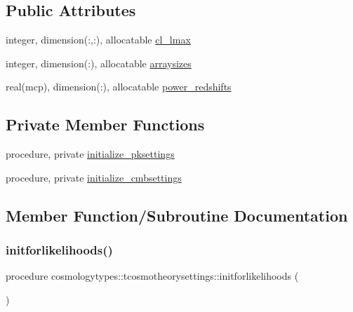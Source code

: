 \subsection*{Public Attributes}
\begin{DoxyCompactItemize}
\item 
integer, dimension(\+:,\+:), allocatable \mbox{\hyperlink{structcosmologytypes_1_1tcosmotheorysettings_a5f4c0617346a109327585503014b734b}{cl\+\_\+lmax}}
\item 
integer, dimension(\+:), allocatable \mbox{\hyperlink{structcosmologytypes_1_1tcosmotheorysettings_a6cff9fff9bb45659c5d3a46e14010fe9}{arraysizes}}
\item 
real(mcp), dimension(\+:), allocatable \mbox{\hyperlink{structcosmologytypes_1_1tcosmotheorysettings_a509595c93e5588acbd6f1fbed9b77b4f}{power\+\_\+redshifts}}
\end{DoxyCompactItemize}
\subsection*{Private Member Functions}
\begin{DoxyCompactItemize}
\item 
procedure, private \mbox{\hyperlink{structcosmologytypes_1_1tcosmotheorysettings_a0527440b3f7b83faa315a177b46bcf0d}{initialize\+\_\+pksettings}}
\item 
procedure, private \mbox{\hyperlink{structcosmologytypes_1_1tcosmotheorysettings_a378270daf8f0a63957a1ec6fae4beed1}{initialize\+\_\+cmbsettings}}
\end{DoxyCompactItemize}


\subsection{Member Function/\+Subroutine Documentation}
\mbox{\label{structcosmologytypes_1_1tcosmotheorysettings_af515fcc7628babb86fc20d5be711de16}} 
\subsubsection{\texorpdfstring{initforlikelihoods()}{initforlikelihoods()}}
{\footnotesize\ttfamily procedure cosmologytypes\+::tcosmotheorysettings\+::initforlikelihoods (\begin{DoxyParamCaption}{ }\end{DoxyParamCaption})}

